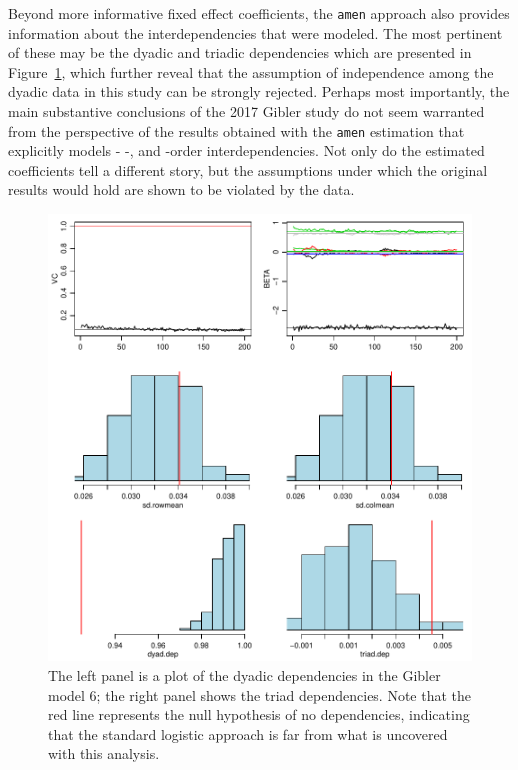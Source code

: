 Beyond more informative fixed effect coefficients, the \texttt{amen} approach also provides information about the interdependencies that were modeled. The most pertinent of these may be the dyadic and triadic dependencies which are presented in Figure~\ref{fig:gibler:dyadtriad}, which further reveal that the assumption of independence among the dyadic data in this study can be strongly rejected. Perhaps most importantly, the main substantive conclusions of the 2017 Gibler study do not seem warranted from the perspective of the results obtained with the \texttt{amen} estimation that explicitly models \first- \second-, and \third-order interdependencies. Not only do the estimated coefficients tell a different story, but the assumptions under which the original results would hold are shown to be violated by the data.

\begin{figure}
\caption{\label{fig:gibler:dyadtriad} The left panel is  a plot of the dyadic dependencies in the Gibler model 6; the right panel shows the triad dependencies.  Note that the red line represents the null hypothesis of no dependencies, indicating that the standard logistic approach is far from what is uncovered with this analysis. }
\includegraphics[width=\textwidth]{netplots}
\end{figure}
\FloatBarrier
